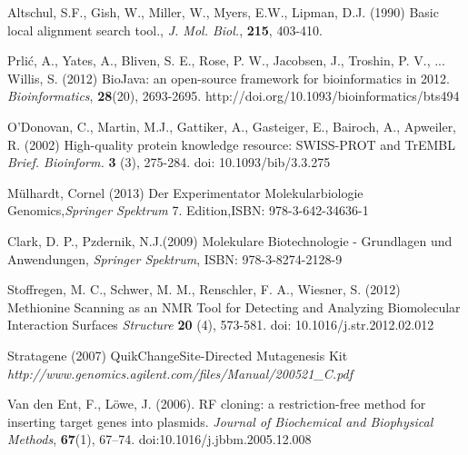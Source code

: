 \documentclass{bioinfo}
\begin{document}
%
%
%
%
%
%
%
%
%


\begin{thebibliography}{}

Altschul, S.F., Gish, W., Miller, W., Myers, E.W., Lipman, D.J. (1990) Basic local alignment search tool., {\it J. Mol. Biol.}, {\bf 215}, 403-410.

Prli\'{c}, A., Yates, A., Bliven, S. E., Rose, P. W., Jacobsen, J., Troshin, P. V., ... Willis, S. (2012) BioJava: an open-source framework for bioinformatics in 2012. {\it Bioinformatics}, {\bf 28}(20), 2693-2695. http://doi.org/10.1093/bioinformatics/bts494

O'Donovan, C., Martin, M.J., Gattiker, A., Gasteiger, E., Bairoch, A., Apweiler, R. (2002) High-quality protein knowledge resource: SWISS-PROT and TrEMBL {\it Brief. Bioinform.}  {\bf 3} (3), 275-284. doi: 10.1093/bib/3.3.275 

M\"{u}lhardt, Cornel (2013) Der Experimentator Molekularbiologie Genomics,{\it Springer Spektrum} 7. Edition,ISBN: 978-3-642-34636-1

Clark, D. P., Pzdernik, N.J.(2009) Molekulare Biotechnologie - Grundlagen und Anwendungen, {\it Springer Spektrum}, ISBN: 978-3-8274-2128-9

Stoffregen, M. C., Schwer, M. M., Renschler, F. A., Wiesner, S. (2012) Methionine Scanning as an NMR Tool for Detecting and Analyzing Biomolecular Interaction Surfaces {\it Structure} {\bf 20} (4), 573-581. doi: 10.1016/j.str.2012.02.012

Stratagene (2007) QuikChange\textregistered Site-Directed Mutagenesis Kit {\it http://www.genomics.agilent.com/files/Manual/200521\_C.pdf}
 
Van den Ent, F.,  L\"{o}we, J. (2006). RF cloning: a restriction-free method for inserting target genes into plasmids. {\it Journal of Biochemical and Biophysical Methods}, {\bf 67}(1), 67–74. doi:10.1016/j.jbbm.2005.12.008
 
\end{thebibliography}
\end{document}
